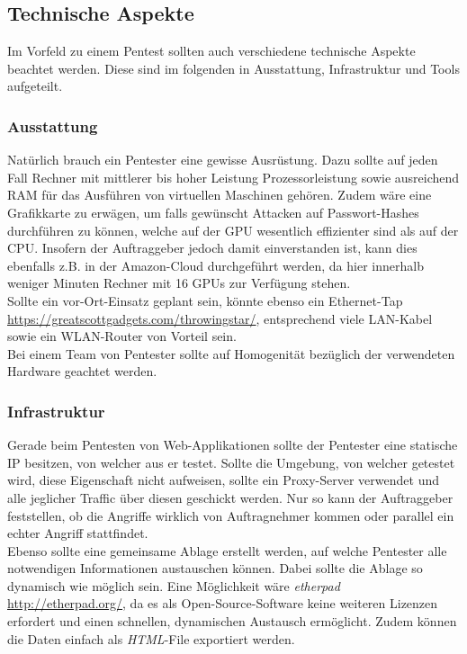 	\subsection{Technische Aspekte}
	Im Vorfeld zu einem Pentest sollten auch verschiedene technische Aspekte beachtet werden. Diese sind im folgenden in Ausstattung, Infrastruktur und Tools aufgeteilt.
	
		\subsubsection{Ausstattung}
		Natürlich brauch ein Pentester eine gewisse Ausrüstung. Dazu sollte auf jeden Fall Rechner mit mittlerer bis hoher Leistung Prozessorleistung sowie ausreichend RAM für das Ausführen von virtuellen Maschinen gehören. Zudem wäre eine Grafikkarte zu erwägen, um falls gewünscht Attacken auf Passwort-Hashes durchführen zu können, welche auf der GPU wesentlich effizienter sind als auf der CPU. Insofern der Auftraggeber jedoch damit einverstanden ist, kann dies ebenfalls z.B. in der Amazon-Cloud durchgeführt werden, da hier innerhalb weniger Minuten Rechner mit 16 GPUs zur Verfügung stehen.\\
		
		Sollte ein vor-Ort-Einsatz geplant sein, könnte ebenso ein Ethernet-Tap \url{https://greatscottgadgets.com/throwingstar/}, entsprechend viele LAN-Kabel sowie ein WLAN-Router von Vorteil sein.\\
		
		Bei einem Team von Pentester sollte auf Homogenität bezüglich der verwendeten Hardware geachtet werden.

		\subsubsection{Infrastruktur}\label{ref:vorbInfrastruktur}
		Gerade beim Pentesten von Web-Applikationen sollte der Pentester eine statische IP besitzen, von welcher aus er testet. Sollte die Umgebung, von welcher getestet wird, diese Eigenschaft nicht aufweisen, sollte ein Proxy-Server verwendet und alle jeglicher Traffic über diesen geschickt werden. Nur so kann der Auftraggeber feststellen, ob die Angriffe wirklich von Auftragnehmer kommen oder parallel ein echter Angriff stattfindet.\\
		
		Ebenso sollte eine gemeinsame Ablage erstellt werden, auf welche Pentester alle notwendigen Informationen austauschen können. Dabei sollte die Ablage so dynamisch wie möglich sein. Eine Möglichkeit wäre \textit{etherpad} \url{http://etherpad.org/}, da es als Open-Source-Software keine weiteren Lizenzen erfordert und einen schnellen, dynamischen Austausch ermöglicht. Zudem können die Daten einfach als \textit{HTML}-File exportiert werden.
		
